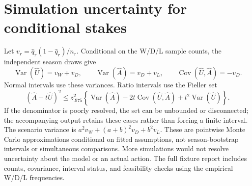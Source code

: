 \documentclass[11pt]{article}
\begin{document}
\section{Simulation uncertainty for conditional stakes}
\label{app:stakes-uncertainty}
Let $v_r=\hat q_r(1-\hat q_r)/n_r$. Conditional on the W/D/L sample counts,
the independent season draws give
\[
 \operatorname{Var}(\hat U)=v_W+v_D,\qquad
 \operatorname{Var}(\hat A)=v_D+v_L,\qquad
 \operatorname{Cov}(\hat U,\hat A)=-v_D.
\]
Normal intervals use these variances. Ratio intervals use the Fieller set
\[
 (\hat A-t\hat U)^2\leq z_{.975}^2
 \left\{\operatorname{Var}(\hat A)-2t\operatorname{Cov}(\hat U,\hat A)
       +t^2\operatorname{Var}(\hat U)\right\}.
\]
If the denominator is poorly resolved, the set can be unbounded or disconnected;
the accompanying output retains these cases rather than forcing a finite
interval. The scenario variance is $a^2v_W+(a+b)^2v_D+b^2v_L$.
These are pointwise Monte Carlo approximations conditional on fitted
assumptions, not season-bootstrap intervals or simultaneous comparisons.
More simulations would not resolve uncertainty about the model or an actual
action. The full fixture report includes counts, covariance, interval status,
and feasibility checks using the empirical W/D/L frequencies.
\end{document}
